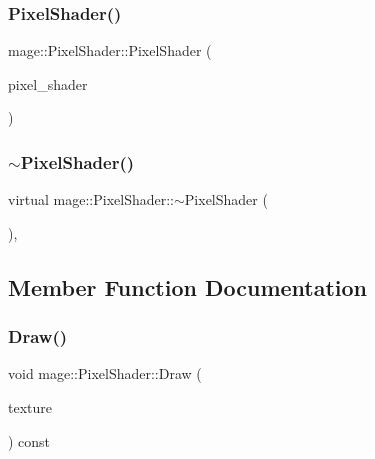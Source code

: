 \subsubsection{\texorpdfstring{Pixel\+Shader()}{PixelShader()}\hspace{0.1cm}{\footnotesize\ttfamily [4/4]}}
{\footnotesize\ttfamily mage\+::\+Pixel\+Shader\+::\+Pixel\+Shader (\begin{DoxyParamCaption}\item[{\hyperlink{classmage_1_1_pixel_shader}{Pixel\+Shader} \&\&}]{pixel\+\_\+shader }\end{DoxyParamCaption})\hspace{0.3cm}{\ttfamily [default]}}

\hypertarget{classmage_1_1_pixel_shader_ac339b9196db24d18143ad36013d598b2}{}\label{classmage_1_1_pixel_shader_ac339b9196db24d18143ad36013d598b2} 
\subsubsection{\texorpdfstring{$\sim$\+Pixel\+Shader()}{~PixelShader()}}
{\footnotesize\ttfamily virtual mage\+::\+Pixel\+Shader\+::$\sim$\+Pixel\+Shader (\begin{DoxyParamCaption}{ }\end{DoxyParamCaption})\hspace{0.3cm}{\ttfamily [virtual]}, {\ttfamily [default]}}



\subsection{Member Function Documentation}
\hypertarget{classmage_1_1_pixel_shader_acff36b2ae6500b720a54a5d41efcc3fe}{}\label{classmage_1_1_pixel_shader_acff36b2ae6500b720a54a5d41efcc3fe} 
\subsubsection{\texorpdfstring{Draw()}{Draw()}\hspace{0.1cm}{\footnotesize\ttfamily [1/3]}}
{\footnotesize\ttfamily void mage\+::\+Pixel\+Shader\+::\+Draw (\begin{DoxyParamCaption}\item[{const \hyperlink{classmage_1_1_texture}{Texture} \&}]{texture }\end{DoxyParamCaption}) const}

